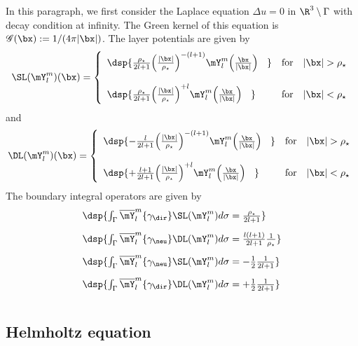 \documentclass[a4paper,11pt]{article}
\begin{document}
In this paragraph, we first consider the Laplace equation $\Delta u = 0$ in $\R^{3}\setminus\Gamma$ with decay 
condition at infinity. The Green kernel of this equation is $\mathscr{G}(\bx):= 1/(4\pi\vert\bx\vert)$. 
The layer potentials are given by
$$
\SL(\mY_{l}^{m})(\bx) =
\left\{\begin{array}{ll}
\dsp{\frac{\rho_{\star}}{2l+1}\Big(\frac{\vert \bx\vert}{\rho_{\star}}\Big)^{-(l+1)}\mY_{l}^{m}\Big(\frac{\bx}{\vert\bx\vert}\Big)\phantom{\imath\kappa} }  
& \textrm{for}\quad \vert \bx\vert> \rho_{\star}\\[15pt]

\dsp{\frac{\rho_{\star}}{2l+1}\Big(\frac{\vert \bx\vert}{\rho_{\star}}\Big)^{+l}\mY_{l}^{m}\Big(\frac{\bx}{\vert\bx\vert}\Big)\phantom{\imath\kappa} }  
& \textrm{for}\quad \vert \bx\vert< \rho_{\star}
\end{array}\right.
$$
and
$$
\DL(\mY_{l}^{m})(\bx) =
\left\{\begin{array}{ll}
\dsp{-\frac{l}{2l+1}\Big(\frac{\vert \bx\vert}{\rho_{\star}}\Big)^{-(l+1)}\mY_{l}^{m}\Big(\frac{\bx}{\vert\bx\vert}\Big)\phantom{\imath\kappa} }  
& \textrm{for}\quad \vert \bx\vert> \rho_{\star}\\[15pt]

\dsp{+\frac{l+1}{2l+1}\Big(\frac{\vert \bx\vert}{\rho_{\star}}\Big)^{+l}\mY_{l}^{m}\Big(\frac{\bx}{\vert\bx\vert}\Big)\phantom{\imath\kappa} }  
& \textrm{for}\quad \vert \bx\vert< \rho_{\star}
\end{array}\right.
$$
The boundary integral operators are given by
$$
\begin{array}{ll}
\dsp{ \int_{\Gamma}\overline{\mY}_{l}^{m}\{\gamma_{\dir}\}\SL(\mY_{l}^{m}) d\sigma 
= \frac{\rho_{\star}}{2l+1} }\\[10pt]
\dsp{ \int_{\Gamma}\overline{\mY}_{l}^{m}\{\gamma_{\neu}\}\DL(\mY_{l}^{m}) d\sigma 
=  \frac{l(l+1)}{2l+1}\frac{1}{\rho_{\star}}   }\\[10pt]
\dsp{ \int_{\Gamma}\overline{\mY}_{l}^{m}\{\gamma_{\neu}\}\SL(\mY_{l}^{m}) d\sigma 
=  -\frac{1}{2}\frac{1}{2l+1} }\\[10pt]
\dsp{ \int_{\Gamma}\overline{\mY}_{l}^{m}\{\gamma_{\dir}\}\DL(\mY_{l}^{m}) d\sigma 
=  +\frac{1}{2}\frac{1}{2l+1} }\\[10pt]

\end{array}
$$




\subsection{Helmholtz equation}\label{Helmholtz3D}
\end{document}
